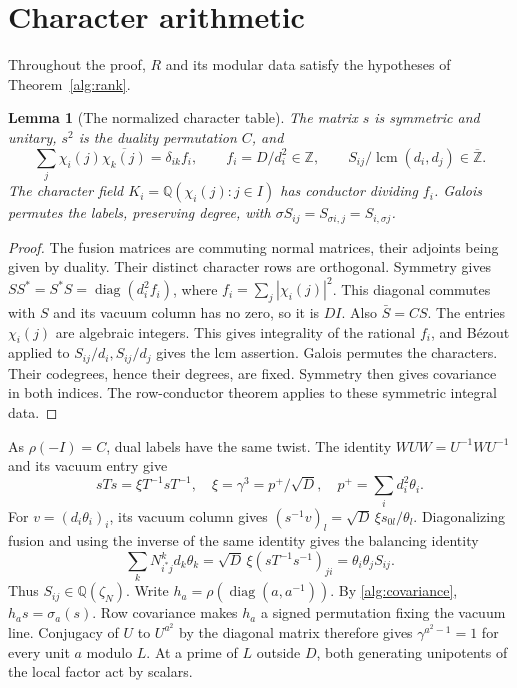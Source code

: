 \documentclass[11pt]{amsart}
\numberwithin{equation}{section}
\newtheorem{lemma}[theorem]{Lemma}
\theoremstyle{definition}
\theoremstyle{plain}
\DeclareMathOperator{\lcm}{lcm}
\newcommand{\QQ}{\mathbb Q}
\newcommand{\ZZ}{\mathbb Z}
\begin{document}
\section{Character arithmetic}
Throughout the proof, $R$ and its modular data satisfy the hypotheses of Theorem~\ref{alg:rank}.

\begin{lemma}[The normalized character table]
The matrix $s$ is symmetric and unitary, $s^2$ is the duality
permutation $C$, and
\begin{equation}
 \sum_j\chi_i(j)\overline{\chi_k(j)}=\delta_{ik}f_i,\qquad
 f_i=D/d_i^2\in\ZZ,\qquad S_{ij}/\lcm(d_i,d_j)\in\overline{\mathbb Z} .
\end{equation}
The character field $K_i=\QQ(\chi_i(j):j\in I)$ has conductor dividing
$f_i$. Galois permutes the labels, preserving degree, with
$\sigma S_{ij}=S_{\sigma i,j}=S_{i,\sigma j}$.
\end{lemma}
\begin{proof}
The fusion matrices are commuting normal matrices, their adjoints
being given by duality. Their distinct character rows are orthogonal.
Symmetry gives $SS^*=S^*S=\operatorname{diag}(d_i^2f_i)$, where
$f_i=\sum_j|\chi_i(j)|^2$. This diagonal commutes with $S$ and its
vacuum column has no zero, so it is $DI$. Also $\bar S=CS$.
The entries $\chi_i(j)$ are algebraic integers. This gives integrality
of the rational $f_i$, and B\'ezout applied to $S_{ij}/d_i,S_{ij}/d_j$
gives the lcm assertion. Galois permutes the characters. Their
codegrees, hence their degrees, are fixed. Symmetry then gives
covariance in both indices. The row-conductor theorem
\cite[Theorem~2.9]{BDPcore} applies to these symmetric integral data.
\end{proof}

As $\rho(-I)=C$, dual labels have the same twist. The identity
$WUW=U^{-1}WU^{-1}$ and its vacuum entry give
\[
 sTs=\xi T^{-1}sT^{-1},\quad \xi=\gamma^3=p^+/\sqrt D,\quad p^+=\sum_i d_i^2\theta_i .
\]
For $v=(d_i\theta_i)_i$, its vacuum column gives
$(s^{-1}v)_l=\sqrt D\,\xi s_{0l}/\theta_l$. Diagonalizing fusion
and using the inverse of the same identity gives the balancing identity
\[
 \sum_k N_{i^*j}^k d_k\theta_k
 =\sqrt D\,\xi(sT^{-1}s^{-1})_{ji}=\theta_i\theta_j S_{ij}.
\]
Thus $S_{ij}\in\QQ(\zeta_N)$. Write $h_a=\rho(\operatorname{diag}(a,a^{-1}))$.
By \eqref{alg:covariance}, $h_as=\sigma_a(s)$. Row covariance makes
$h_a$ a signed permutation fixing the vacuum line. Conjugacy of $U$ to $U^{a^2}$ by
the diagonal matrix therefore gives $\gamma^{a^2-1}=1$ for every
unit $a$ modulo $L$. At a prime of $L$ outside $D$, both generating
unipotents of the local factor act by scalars.
\end{document}
